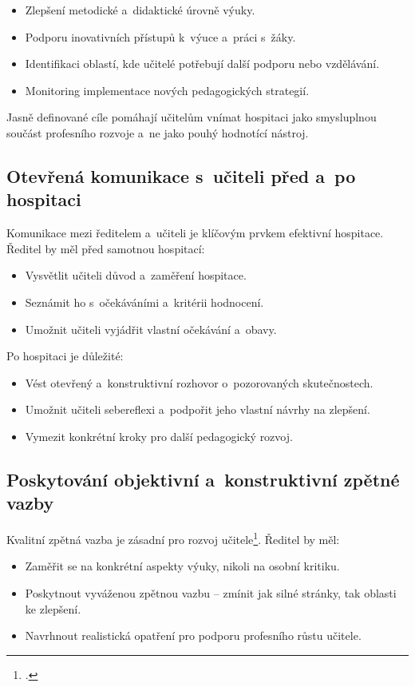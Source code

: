 \begin{itemize}
    \item Zlepšení metodické a~didaktické úrovně výuky.
    \item Podporu inovativních přístupů k~výuce a~práci s~žáky.
    \item Identifikaci oblastí, kde učitelé potřebují další podporu nebo vzdělávání.
    \item Monitoring implementace nových pedagogických strategií.
\end{itemize}

Jasně definované cíle pomáhají učitelům vnímat hospitaci jako smysluplnou součást profesního rozvoje a~ne jako pouhý hodnotící nástroj.

\subsection{Otevřená komunikace s~učiteli před a~po hospitaci}
Komunikace mezi ředitelem a~učiteli je klíčovým prvkem efektivní hospitace. Ředitel by měl před samotnou hospitací:

\begin{itemize}
    \item Vysvětlit učiteli důvod a~zaměření hospitace.
    \item Seznámit ho s~očekáváními a~kritérii hodnocení.
    \item Umožnit učiteli vyjádřit vlastní očekávání a~obavy.
\end{itemize}

Po hospitaci je důležité:

\begin{itemize}
    \item Vést otevřený a~konstruktivní rozhovor o~pozorovaných skutečnostech.
    \item Umožnit učiteli sebereflexi a~podpořit jeho vlastní návrhy na zlepšení.
    \item Vymezit konkrétní kroky pro další pedagogický rozvoj.
\end{itemize}

\subsection{Poskytování objektivní a~konstruktivní zpětné vazby}
Kvalitní zpětná vazba je zásadní pro rozvoj učitele\footcite[16]{hospitace-funkce}. Ředitel by měl:

\begin{itemize}
    \item Zaměřit se na konkrétní aspekty výuky, nikoli na osobní kritiku.
    \item Poskytnout vyváženou zpětnou vazbu – zmínit jak silné stránky, tak oblasti ke zlepšení.
    \item Navrhnout realistická opatření pro podporu profesního růstu učitele.
\end{itemize}

